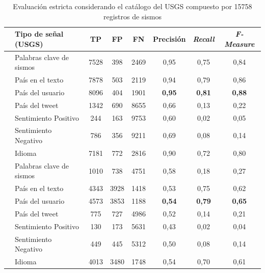 \begin{table}[!ht]
\centering
  \begin{tabular}{c|lcccccc}
    \toprule
    & \multicolumn{1}{l}{{Tipo de señal (USGS)}}&\multicolumn{1}{c}{{TP}}&\multicolumn{1}{c}{{FP}}&\multicolumn{1}{c}{{FN}}&\multicolumn{1}{c}{{Precisión}}&\multicolumn{1}{c}{{\em Recall}}&\multicolumn{1}{c}{{\em F-Measure}}\\
    \midrule
    \parbox[t]{1.5mm}{\vspace{-0.3cm}}
    & {Palabras clave de sismos} & 7528 & 398 & 2469 & {0,95} &  {0,75} & {0,84} \\
	& {País en el texto } & 7878 & 503 & 2119 & {0,94} & {0,79} & {0,86} \\    
    & {País del usuario} & 8096 & 404 & 1901  & {{\bf 0,95}} & {{\bf 0,81}} & {\bf 0,88} \\
    & {País del tweet} & 1342 & 690 & 8655 & {0,66} & {0,13} & {0,22} \\  
    & {Sentimiento Positivo} & 244 & 163 & 9753 & {0,60} &	{0,02} & {0,05} \\
    & {Sentimiento Negativo} & 786 & 356 & 9211 & {0,69} &	{0,08} & {0,14} \\
    & {Idioma} & 7181 & 772 & 2816 & {0,90} & {0,72} & {0,80} \\
    \midrule
    \parbox[t]{1.5mm}{\vspace{-0.3cm}}
	& {Palabras clave de sismos} & 1010 & 738 & 4751 & {0,58} & {0,18} & {0,27} \\
	& {País en el texto} & 4343 & 3928 & 1418 & {0,53} & {0,75} & {0,62} \\
	& {País del usuario} & 4573 & 3853 & 1188 & {\bf 0,54} & {\bf 0,79} & {\bf 0,65} \\
	& {País del tweet} & 775 & 727 & 4986 & {0,52} & {0,14} & {0,21} \\ 
	& {Sentimiento Positivo} & 130 & 173 & 5631 & {0,43} & {0,02} & {0,04} \\
	& {Sentimiento Negativo} & 449 & 445 & 5312 & {0,50} &	{0,08} & {0,14} \\
	& {Idioma} & 4013 & 3480 & 1748 & {0,54} & {0,70} & {0,61} \\
    \bottomrule
  \end{tabular}
  \caption{{Evaluación estricta considerando el catálogo del USGS compuesto por 15758 registros de sismos}}
  \label{table:global-strict}
\end{table}
%
%


